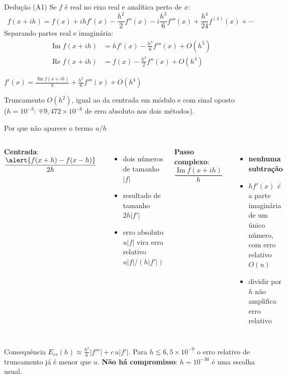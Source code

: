 \documentclass[aspectratio=169,11pt]{beamer}
\renewcommand{\Im}{\operatorname{Im}}
\renewcommand{\Re}{\operatorname{Re}}
\begin{document}
\begin{frame}{Dedução (A1)}
  Se $f$ é real no eixo real e analítica perto de $x$:
  \[
    f(x+ih) = f(x) + ihf'(x) - \frac{h^2}{2}f''(x) - i\frac{h^3}{6}f'''(x) + \frac{h^4}{24}f^{(4)}(x) + \cdots
  \]
  Separando partes real e imaginária:
  \begin{align*}
    \Im f(x+ih) &= hf'(x) - \tfrac{h^3}{6}f'''(x) + O(h^5)\\
    \Re f(x+ih) &= f(x) - \tfrac{h^2}{2}f''(x) + O(h^4)
  \end{align*}
  \begin{block}{}
    \centering
    $\displaystyle f'(x) = \frac{\Im f(x+ih)}{h} + \frac{h^2}{6}f'''(x) + O(h^4)$
  \end{block}
  Truncamento $O(h^2)$, igual ao da centrada em módulo e com sinal oposto\\
  ({\small $h=10^{-3}$: $\mp 9{,}472\times10^{-6}$ de erro absoluto nos dois métodos}).
\end{frame}

\begin{frame}{Por que não aparece o termo $u/h$}
  \small
  \begin{columns}[T]
    \textbf{Centrada}: \ $\dfrac{\alert{f(x+h)-f(x-h)}}{2h}$
    \begin{itemize}
      \item dois números de tamanho $|f|$
      \item resultado de tamanho $2h|f'|$
      \item erro absoluto $u|f|$ vira erro relativo $u|f|/(h|f'|)$
    \end{itemize}
    \textbf{Passo complexo}: \ $\dfrac{\Im f(x+ih)}{h}$
    \begin{itemize}
      \item \textbf{nenhuma subtração}
      \item $hf'(x)$ \emph{é} a parte imaginária de um único número, com erro relativo $O(u)$
      \item dividir por $h$ não amplifica erro relativo
    \end{itemize}
  \end{columns}
  \vspace{0.3em}
  \begin{exampleblock}{Consequência}
    $E_{cs}(h)\approx \frac{h^2}{6}|f'''| + c\,u|f'|$. Para $h\lesssim 6{,}5\times10^{-9}$ o erro relativo de truncamento já é menor que $u$.
    \textbf{Não há compromisso}: $h=10^{-30}$ é uma escolha usual.
  \end{exampleblock}
\end{frame}
\end{document}
